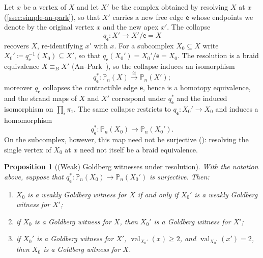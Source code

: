 \documentclass[reqno]{amsart}
\newtheorem{proposition}[theorem]{Proposition}
\theoremstyle{definition}
\newcommand\sfe{\mathsf{e}}
\newcommand{\PB}{\mathbb{P}}
\DeclareMathOperator{\val}{val}
\numberwithin{equation}{section}
\begin{document}
Let \(x\) be a vertex of \(X\) and let \(X'\) be the complex obtained
by resolving \(X\) at \(x\) (\cref{ssec:simple-an-park}), so that
\(X'\) carries a new free edge \(\sfe\) whose endpoints we denote by the
original vertex \(x\) and the new apex \(x'\). The collapse
\[
q_\sfe\colon X'\longrightarrow X'/\sfe = X
\]
recovers \(X\), re-identifying \(x'\) with \(x\). For a subcomplex
\(X_0\subseteq X\) write
\(X_0'\coloneqq q_\sfe^{-1}(X_0)\subseteq X'\), so that
\(q_\sfe(X_0')=X_0'/\sfe=X_0\). The resolution is a braid equivalence
\(X\equiv_B X'\) (An--Park~\cite[Prop.~3.11]{AnPark2017}), so the
collapse induces an isomorphism
\[
q_\sfe^\ast\colon\PB_n(X)\xrightarrow{\cong}\PB_n(X');
\]
moreover \(q_\sfe\) collapses the contractible edge \(\sfe\), hence is a
homotopy equivalence, and the strand maps of \(X\) and \(X'\)
correspond under \(q_\sfe^\ast\) and the induced isomorphism on
\(\prod_i\pi_1\). The same collapse restricts to
\(q_\sfe\colon X_0'\to X_0\) and induces a homomorphism
\[
q_\sfe^\ast\colon\PB_n(X_0)\longrightarrow\PB_n(X_0').
\]
On the subcomplex, however, this map need not be surjective
(\cite[Prop.~3.1]{AnPark2017}): resolving the single vertex of
\(X_0\) at \(x\) need not itself be a braid equivalence.

\begin{proposition}[(Weak) Goldberg witnesses under resolution]
\label{prop:goldberg-resolution}
With the notation above, suppose that
\(q_\sfe^\ast\colon\PB_n(X_0)\to\PB_n(X_0')\) is surjective. Then:
\begin{enumerate}[label=\textup{(\arabic*)},leftmargin=2.4em]
  \item \(X_0\) is a weakly Goldberg witness for \(X\) if and only if
        \(X_0'\) is a weakly Goldberg witness for \(X'\);
  \item if \(X_0\) is a Goldberg witness for \(X\), then \(X_0'\) is a
        Goldberg witness for \(X'\);
  \item if \(X_0'\) is a Goldberg witness for \(X'\),
        \(\val_{X_0'}(x)\ge 2\), and \(\val_{X_0'}(x')=2\), then \(X_0\) is a Goldberg
        witness for \(X\).
\end{enumerate}
\end{proposition}
\end{document}
